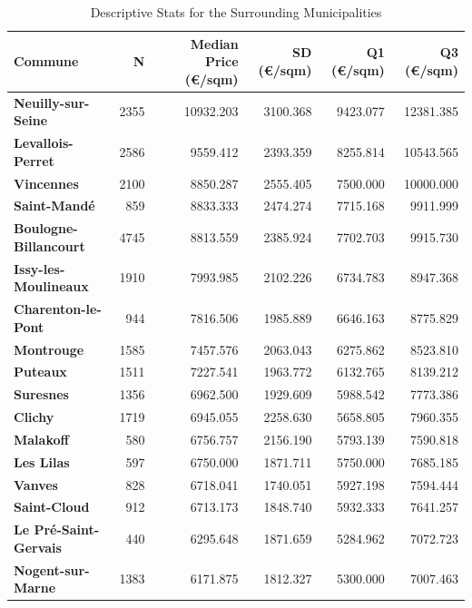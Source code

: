 \documentclass[12pt]{article}
\theoremstyle{plain}
\theoremstyle{remark}
\begin{document}
\begin{table}[!h]
    \centering
    \caption{Descriptive Stats for the Surrounding Municipalities}
    \begin{tabular}{lrrrrr}
        \toprule
        \textbf{Commune} & \textbf{N} & \textbf{Median Price (€/sqm)} & \textbf{SD (€/sqm)} & \textbf{Q1 (€/sqm)} & \textbf{Q3 (€/sqm)} \\
        \midrule
        \rowcolor{gray!10}\textbf{Neuilly-sur-Seine} & 2355 & 10932.203 & 3100.368 & 9423.077 & 12381.385 \\
        \textbf{Levallois-Perret} & 2586 & 9559.412 & 2393.359 & 8255.814 & 10543.565 \\
        \rowcolor{gray!10}\textbf{Vincennes} & 2100 & 8850.287 & 2555.405 & 7500.000 & 10000.000 \\
        \textbf{Saint-Mandé} & 859 & 8833.333 & 2474.274 & 7715.168 & 9911.999 \\
        \rowcolor{gray!10}\textbf{Boulogne-Billancourt} & 4745 & 8813.559 & 2385.924 & 7702.703 & 9915.730 \\
        \textbf{Issy-les-Moulineaux} & 1910 & 7993.985 & 2102.226 & 6734.783 & 8947.368 \\
        \rowcolor{gray!10}\textbf{Charenton-le-Pont} & 944 & 7816.506 & 1985.889 & 6646.163 & 8775.829 \\
        \midrule
        \textbf{Montrouge} & 1585 & 7457.576 & 2063.043 & 6275.862 & 8523.810 \\
        \rowcolor{gray!10}\textbf{Puteaux} & 1511 & 7227.541 & 1963.772 & 6132.765 & 8139.212 \\
        \textbf{Suresnes} & 1356 & 6962.500 & 1929.609 & 5988.542 & 7773.386 \\
        \rowcolor{gray!10}\textbf{Clichy} & 1719 & 6945.055 & 2258.630 & 5658.805 & 7960.355 \\
        \textbf{Malakoff} & 580 & 6756.757 & 2156.190 & 5793.139 & 7590.818 \\
        \rowcolor{gray!10}\textbf{Les Lilas} & 597 & 6750.000 & 1871.711 & 5750.000 & 7685.185 \\
        \textbf{Vanves} & 828 & 6718.041 & 1740.051 & 5927.198 & 7594.444 \\
        \midrule
        \rowcolor{gray!10}\textbf{Saint-Cloud} & 912 & 6713.173 & 1848.740 & 5932.333 & 7641.257 \\
        \textbf{Le Pré-Saint-Gervais} & 440 & 6295.648 & 1871.659 & 5284.962 & 7072.723 \\
        \rowcolor{gray!10}\textbf{Nogent-sur-Marne} & 1383 & 6171.875 & 1812.327 & 5300.000 & 7007.463 \\

\end{tabular}
\end{table}
\end{document}
